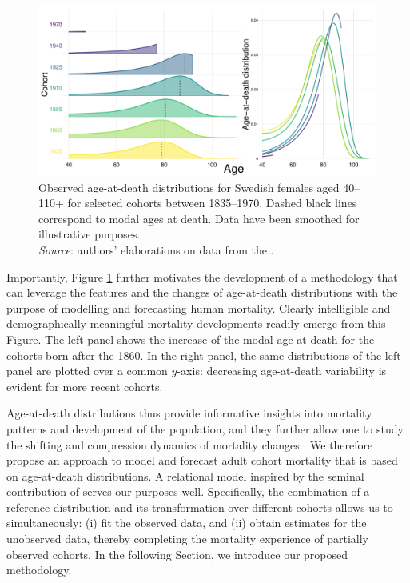 \documentclass[11pt, a4paper]{article}
\begin{document}
\begin{figure}[t]
	\begin{center}
		\includegraphics[scale=0.60]{./Figures/F1.pdf}
		\caption{Observed age-at-death distributions for Swedish females aged 40--110+ for selected cohorts between 1835--1970. Dashed black lines correspond to modal ages at death. Data have been smoothed for illustrative purposes. \\ \small \textit{Source}: authors' elaborations on data from the \cite{HMD}.}\label{Fig:ADDcohort}	
	\end{center}
\end{figure}

Importantly, Figure \ref{Fig:ADDcohort} further motivates the development of a methodology that can leverage the features and the changes of age-at-death distributions with the purpose of modelling and forecasting human mortality. Clearly intelligible and demographically meaningful mortality developments readily emerge from this Figure. The left panel shows the increase of the modal age at death for the cohorts born after the 1860. In the right panel, the same distributions of the left panel are plotted over a common $y$-axis: decreasing age-at-death variability is evident for more recent cohorts.

Age-at-death distributions thus provide informative insights into mortality patterns and development of the population, and they further allow one to study the shifting and compression dynamics of mortality changes \cite[see, e.g.,][]{fries1980aging,kannisto2001mode,bongaarts2005long,janssen2019timing}. We therefore propose an approach to model and forecast adult cohort mortality that is based on age-at-death distributions. A relational model inspired by the seminal contribution of \cite{brass1971scale} serves our purposes well. Specifically, the combination of a reference distribution and its transformation over different cohorts allows us to simultaneously: (i) fit the observed data, and (ii) obtain estimates for the unobserved data, thereby completing the mortality experience of partially observed cohorts. In the following Section, we introduce our proposed methodology.  
\end{document}
